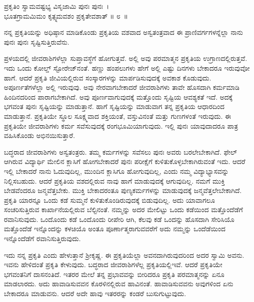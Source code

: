 \begin{shloka}
ಪ್ರಕೃತಿಂ ಸ್ವಾಮವಷ್ಟಭ್ಯ ವಿಸೃಜಾಮಿ ಪುನಃ ಪುನಃ~।\\ಭೂತಗ್ರಾಮಮಿಮಂ ಕೃತ್ಸ್ನಮವಶಂ ಪ್ರಕೃತೇವಶಾತ್ \hfill॥ ೮~॥
\end{shloka}

\begin{artha}
ನನ್ನ ಪ್ರಕೃತಿಯನ್ನು ಅಧಿಷ್ಠಾನ ಮಾಡಿಕೊಂಡು ಪ್ರಕೃತಿಯ ವಶವಾದ ಅಸ್ವತಂತ್ರವಾದ ಈ ಪ್ರಾಣಿ\-ವರ್ಗಗಳನ್ನೆಲ್ಲಾ ನಾನು ಪುನಃ ಪುನಃ ಸೃಷ್ಟಿಸುತ್ತಿರುವೆನು.
\end{artha}

ಪ್ರಳಯದಲ್ಲಿ ಜೀವರಾಶಿಗಳೆಲ್ಲಾ ಸುಪ್ತಾವಸ್ಥೆಗೆ ಹೋಗುತ್ತವೆ. ಅಲ್ಲಿ ಅವು ಪರಮಾತ್ಮನ ಪ್ರಕೃತಿಯ ಉಗ್ರಾಣದಲ್ಲಿರುತ್ತವೆ. ಇದು ಒಂದು ಕೋಲ್ಡ್ ಸ್ಟೋರೇಜ್​ನಂತೆ. ಹಣ್ಣು ಹಂಪಲುಗಳು ಹೇಗೆ ಅಲ್ಲಿ ಎಷ್ಟು ದಿನಗಳು ಬೇಕಾದರೂ ಇರುವುವೋ ಹಾಗೆ. ಆದರೆ ಪ್ರಕೃತಿ ಜೀವಿ\-ಯಲ್ಲಿರುವ ಸಂಸ್ಕಾರಗಳನ್ನು ಮಾರ್ಪಡಿಸುವುದಕ್ಕೆ ಅವಕಾಶ ಕೊಡುವುದು. ಅಪೂರ್ಣತೆಗಳೆಲ್ಲಾ ಅಲ್ಲಿ ಇರುವುವು. ಅವು ನೇರವಾಗಬೇಕಾದರೆ ಜೀವರಾಶಿಗಳು ತಾವೇ ಹೊಸದಾಗಿ ಕರ್ಮಮಾಡಿ ಹಿಂದಿನದರಿಂದ ಪಾರಾಗಬೇಕಾಗಿದೆ. ಅವು ಪೂರ್ಣವಾಗುವುದಕ್ಕೆ ಮತ್ತೊಂದು ಸೃಷ್ಟಿಯ ಆವಶ್ಯ\-ಕತೆ ಇದೆ. ಅದಕ್ಕೆ ಭಗವಂತ ಪುನಃ ಸೃಷ್ಟಿಯನ್ನು ಮಾಡುತ್ತಾನೆ. ಹಾಗೆ ಸೃಷ್ಟಿಯನ್ನು ಮಾಡುವಾಗ ತನ್ನ ಪ್ರಕೃತಿಯ ಆಧಾರದಿಂದ ಮಾಡುತ್ತಾನೆ. ಪ್ರಕೃತಿಯೇ ಸ್ಥೂಲ ಸೂಕ್ಷ್ಮವಾದ ಶಕ್ತಿಯಂತೆ, ವಸ್ತುವಿನಂತೆ ಮತ್ತು ಗುಣಗಳಂತೆ ಇರುವುದು. ಈ ಪ್ರಕೃತಿಯೇ ಜೀವರಾಶಿಗಳು ಕರ್ಮ ಸವೆಸುವುದಕ್ಕೆ ರಂಗಭೂಮಿಯಾಗುವುದು. ಇಲ್ಲಿ ಪುನಃ ಯಾವುದಾದರೂ ಪಾತ್ರ ವಹಿಸಿಕೊಂಡು ಅಭಿನಯಿಸುತ್ತಾರೆ.

ಬದ್ಧರಾದ ಜೀವರಾಶಿಗಳು ಅಸ್ವತಂತ್ರರು. ತಮ್ಮ ಕರ್ಮಗಳನ್ನು ಸವೆಸಲು ಪುನಃ ಅವರು ಬರಲೇಬೇಕಾಗಿದೆ. ಫೇಲ್ ಆಗಿರುವ ವಿದ್ಯಾರ್ಥಿ ಮೇಲಿನ ಕ್ಲಾಸಿಗೆ ಹೋಗಬೇಕಾದರೆ ಪುನಃ ಪರೀಕ್ಷೆಗೆ ಕುಳಿತುಕೊಳ್ಳಬೇಕಾಗಿರುವಂತೆ ಇದು. ಆದರೆ ಇಲ್ಲಿ ಬೇಕಾದರೆ ನಾನು ಓದುವುದಿಲ್ಲ, ಮುಂದಿನ ಕ್ಲಾಸಿಗೂ ಹೋಗುವುದಿಲ್ಲ, ಎಂದು ನಮ್ಮ ವಿದ್ಯಾಭ್ಯಾಸವನ್ನು ನಿಲ್ಲಿಸಬಹುದು. ಆದರೆ ಪ್ರಕೃತಿಯ ವಶದಲ್ಲಿರುವ ನಾವು ಹಾಗೆ ಮಾಡುವುದಕ್ಕೆ ಆಗುವುದಿಲ್ಲ. ನಮಗೆ ಮುಕ್ತಿ ಬೇಡ\-ವೆಂದರೂ ಜನ್ಮವೆತ್ತಬೇಕು. ಮುಕ್ತಿ ಬೇಕಾದರಂತೂ ಪುಣ್ಯಕರ್ಮಗಳನ್ನು ಮಾಡುವುದಕ್ಕೆ ಜನ್ಮ\-ವೆತ್ತಲೇಬೇಕಾಗಿದೆ. ಪ್ರಕೃತಿ ಯಾರನ್ನೂ ಒಂದು ಕಡೆ ಸುಮ್ಮನೆ ಕುಳಿತುಕೊಂಡಿರುವುದಕ್ಕೆ ಬಿಡುವುದಿಲ್ಲ. ಅದು ಯಾವಾಗಲೂ ಸಂಚರಿಸುತ್ತಿರುವ ಕಾರ್ಖಾನೆಯಲ್ಲಿರುವ ಬೆಲ್ಟಿನಂತೆ. ನಮ್ಮನ್ನು ಅದರ ಮೇಲಿಟ್ಟು ಒಂದು ಕಡೆಯಿಂದ ಮತ್ತೊಂದೆಡೆಗೆ ರವಾನಿಸುವುದು. ಒಂದೊಂದು ಕಡೆ ಒಂದೊಂದು ರೀಪೇರಿ ಆಗಿ, ಕೆಲವು ಕಡೆ ಒಂದನ್ನು ಹೊಸದಾಗಿ ಸೇರಿಸಿಯೊ ಮತ್ತೊಂದೆಡೆ ಇನ್ನೊಂದನ್ನು ಕಳಚಿಯೊ ಅಂತೂ ಪೂರ್ಣಾತ್ಮರಾಗುವವರೆಗೆ ಅದು ನಮ್ಮನ್ನು ಒಂದೆಡೆಯಿಂದ ಇನ್ನೊಂದೆಡೆಗೆ ರವಾನಿಸುತ್ತಿರುವುದು.

ಇದು ನನ್ನ ಪ್ರಕೃತಿ ಎಂದು ಹೇಳುತ್ತಾನೆ ಶ‍್ರೀಕೃಷ್ಣ. ಈ ಪ್ರಕೃತಿಯೆಲ್ಲಾ ಅವನದಾಗಿರುವುದರಿಂದ ಅದರ ಸ್ವಾಮಿ ಅವನು. ಇವನು ಹೇಳಿದಂತೆ ಪ್ರಕೃತಿ ಕೇಳುವುದು. ಬದ್ಧರಾದ ಜೀವರಾಶಿಗಳೆಲ್ಲ ಪ್ರಕೃತಿಯಲ್ಲಿಇವೆ. ಆದರೆ ಪ್ರಕೃತಿಯೇ ಭಗವಂತನಿಗೆ ದಾಸನಂತಿದೆ. ಇತರರ ಮೇಲೆ ತನ್ನ ಪ್ರಭಾವವನ್ನು ಬೀರಿದರೂ ಪ್ರಕೃತಿ ಪರಮಾತ್ಮನನ್ನು ಏನೂ ಮಾಡಲಾರದು. ಅದು ಹಾವಾಡಿಸುವವನ ಕೊರಳಿನಲ್ಲಿರುವ ಹಾವಿನಂತೆ. ಹಾವಾಡಿಸುವವನು ಅವುಗಳಿಂದ ಏನು ಬೇಕಾದರೂ ಮಾಡುವನು. ಆದರೆ ಅದೇ ಹಾವು ಇತರರನ್ನು ಕಂಡರೆ ಬುಸುಗುಟ್ಟುವುದು.

